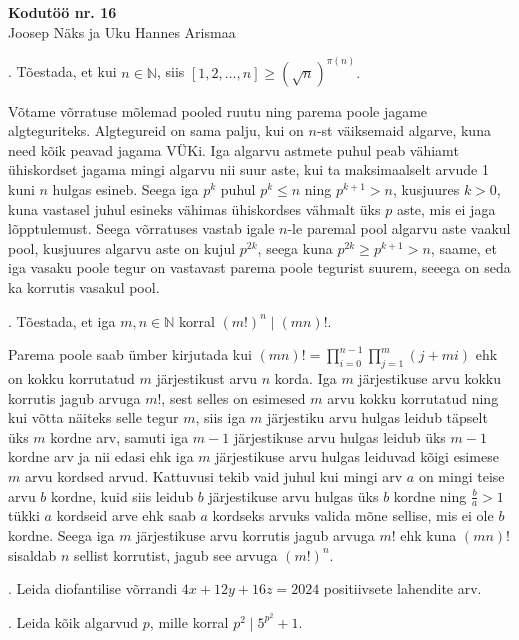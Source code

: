 \documentclass[a4paper, 10pt]{article}
\newcommand{\N}{\mathbb{N}}
\begin{document}
\begin{center}
\Large\textbf{Kodutöö nr. 16}\\
\small{Joosep Näks ja Uku Hannes Arismaa}
\end{center}


\bigskip

. Tõestada, et kui $n\in\N$, siis $[1,2,\ldots,n]\geq\left(\sqrt{n}\right)^{\pi(n)}.$

\bigskip
Võtame võrratuse mõlemad pooled ruutu ning parema poole jagame algteguriteks. Algtegureid on sama palju, kui on $n$-st väiksemaid algarve, kuna need kõik peavad jagama VÜKi. Iga algarvu astmete puhul peab vähiamt ühiskordset jagama mingi algarvu nii suur aste, kui ta maksimaalselt arvude 1 kuni $n$ hulgas esineb. Seega iga $p^k$ puhul $p^k\leq n$ ning $p^{k+1}>n$, kusjuures $k>0$, kuna vastasel juhul esineks vähimas ühiskordses vähmalt üks $p$ aste, mis ei jaga lõpptulemust. Seega võrratuses vastab igale $n$-le paremal pool algarvu aste vaakul pool, kusjuures algarvu aste on kujul $p^{2k}$, seega kuna $p^{2k}\geq p^{k+1}>n$, saame, et iga vasaku poole tegur on vastavast parema poole tegurist suurem, seeega on seda ka korrutis vasakul pool.

\bigskip

. Tõestada, et iga $m,n\in\N$ korral $(m!)^n\mid (mn)!$. 

\bigskip
Parema poole saab ümber kirjutada kui $(mn)!=\prod_{i=0}^{n-1}\prod_{j=1}^{m}(j+mi)$ ehk on kokku korrutatud $m$ järjestikust arvu $n$ korda. Iga $m$ järjestikuse arvu kokku korrutis jagub arvuga $m!$, sest selles on esimesed $m$ arvu kokku korrutatud ning kui võtta näiteks selle tegur $m$, siis iga $m$ järjestiku arvu hulgas leidub täpselt üks $m$ kordne arv, samuti iga $m-1$ järjestikuse arvu hulgas leidub üks $m-1$ kordne arv ja nii edasi ehk iga $m$ järjestikuse arvu hulgas leiduvad kõigi esimese $m$ arvu kordsed arvud. Kattuvusi tekib vaid juhul kui mingi arv $a$ on mingi teise arvu $b$ kordne, kuid siis leidub $b$ järjestikuse arvu hulgas üks $b$ kordne ning $\frac ba>1$ tükki $a$ kordseid arve ehk saab $a$ kordseks arvuks valida mõne sellise, mis ei ole $b$ kordne. Seega iga $m$ järjestikuse arvu korrutis jagub arvuga $m!$ ehk kuna $(mn)!$ sisaldab $n$ sellist korrutist, jagub see arvuga $(m!)^n$.
\bigskip

. Leida diofantilise võrrandi $4x+12y+16z = 2024$ positiivsete lahendite arv. 

\bigskip

. Leida kõik algarvud $p$, mille korral $p^2\mid 5^{p^2}+1$.
\end{document}
